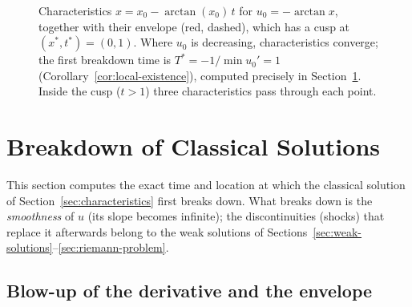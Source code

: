 \begin{figure}[h]
\centering
{}
\caption{Characteristics $x=x_0-\arctan(x_0)\,t$ for $u_0=-\arctan x$,
together with their envelope (red, dashed), which has a cusp at
$(x^*,t^*)=(0,1)$. Where $u_0$ is decreasing, characteristics converge;
the first breakdown time is $T^*=-1/\min u_0'=1$
(Corollary~\ref{cor:local-existence}), computed precisely in
Section~\ref{sec:shock-formation}. Inside the cusp ($t>1$) three
characteristics pass through each point.}
\label{fig:characteristics}
\end{figure}


\section{Breakdown of Classical Solutions}
\label{sec:shock-formation}

This section computes the exact time and location at which the classical
solution of Section~\ref{sec:characteristics} first breaks down. What
breaks down is the \emph{smoothness} of $u$ (its slope becomes infinite);
the discontinuities (shocks) that replace it afterwards belong to the weak
solutions of Sections~\ref{sec:weak-solutions}--\ref{sec:riemann-problem}.

\subsection{Blow-up of the derivative and the envelope}
\label{subsec:shock-derivative-blowup}

